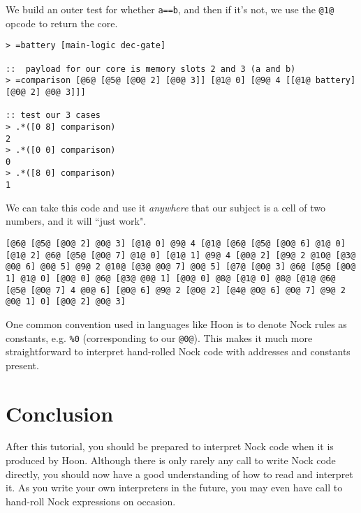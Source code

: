 \documentclass[twoside]{article}
\begin{document}
We build an outer test for whether \lstinline[style=inlinecode]{a==b}, and then if it's not, we use the \lstinline[style=inlinecode]{@1@} opcode to return the core.

\begin{lstlisting}[style=listingblock]
> =battery [main-logic dec-gate]

::  payload for our core is memory slots 2 and 3 (a and b)
> =comparison [@6@ [@5@ [@0@ 2] [@0@ 3]] [@1@ 0] [@9@ 4 [[@1@ battery] [@0@ 2] @0@ 3]]]

:: test our 3 cases
> .*([0 8] comparison)
2
> .*([0 0] comparison)
0
> .*([8 0] comparison)
1
\end{lstlisting}

We can take this code and use it \emph{anywhere} that our subject is a cell of two numbers, and it will ``just work".

\begin{lstlisting}[style=listingblock]
[@6@ [@5@ [@0@ 2] @0@ 3] [@1@ 0] @9@ 4 [@1@ [@6@ [@5@ [@0@ 6] @1@ 0] [@1@ 2] @6@ [@5@ [@0@ 7] @1@ 0] [@1@ 1] @9@ 4 [@0@ 2] [@9@ 2 @10@ [@3@ @0@ 6] @0@ 5] @9@ 2 @10@ [@3@ @0@ 7] @0@ 5] [@7@ [@0@ 3] @6@ [@5@ [@0@ 1] @1@ 0] [@0@ 0] @6@ [@3@ @0@ 1] [@0@ 0] @8@ [@1@ 0] @8@ [@1@ @6@ [@5@ [@0@ 7] 4 @0@ 6] [@0@ 6] @9@ 2 [@0@ 2] [@4@ @0@ 6] @0@ 7] @9@ 2 @0@ 1] 0] [@0@ 2] @0@ 3]
\end{lstlisting}

One common convention used in languages like Hoon is to denote Nock rules as constants, e.g. \@\lstinline[style=inlinecode]{%0} (corresponding to our \lstinline[style=inlinecode]{@0@}).  This makes it much more straightforward to interpret hand-rolled Nock code with addresses and constants present.

\section{Conclusion}

After this tutorial, you should be prepared to interpret Nock code when it is produced by Hoon.  Although there is only rarely any call to write Nock code directly, you should now have a good understanding of how to read and interpret it.  As you write your own interpreters in the future, you may even have call to hand-roll Nock expressions on occasion. \tombstone

\end{document}
